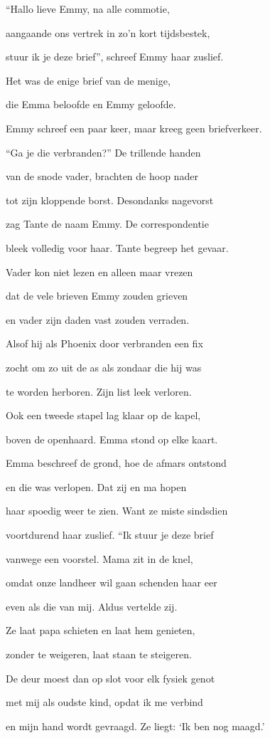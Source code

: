 “Hallo lieve Emmy,
na alle commotie,

aangaande ons vertrek
in zo’n kort tijdsbestek,

stuur ik je deze brief”,
schreef Emmy haar zuslief.

Het was de enige
brief van de menige,

die Emma beloofde
en Emmy geloofde.

Emmy schreef een paar keer,
maar kreeg geen briefverkeer.

“Ga je die verbranden?”
De trillende handen

van de snode vader,
brachten de hoop nader

tot zijn kloppende borst.
Desondanks nagevorst

zag Tante de naam Emmy.
De correspondentie

bleek volledig voor haar.
Tante begreep het gevaar.

Vader kon niet lezen
en alleen maar vrezen

dat de vele brieven
Emmy zouden grieven

en vader zijn daden
vast zouden verraden.

Alsof hij als Phoenix
door verbranden een fix

zocht om zo uit de as
als zondaar die hij was

te worden herboren.
Zijn list leek verloren.

Ook een tweede stapel
lag klaar op de kapel,

boven de openhaard.
Emma stond op elke kaart.

Emma beschreef de grond,
hoe de afmars ontstond

en die was verlopen.
Dat zij en ma hopen

haar spoedig weer te zien.
Want ze miste sindsdien

voortdurend haar zuslief.
“Ik stuur je deze brief

vanwege een voorstel.
Mama zit in de knel,

omdat onze landheer
wil gaan schenden haar eer

even als die van mij.
Aldus vertelde zij.

Ze laat papa schieten
en laat hem genieten,

zonder te weigeren,
laat staan te steigeren.

De deur moest dan op slot
voor elk fysiek genot

met mij als oudste kind,
opdat ik me verbind

en mijn hand wordt gevraagd.
Ze liegt: ‘Ik ben nog maagd.’

